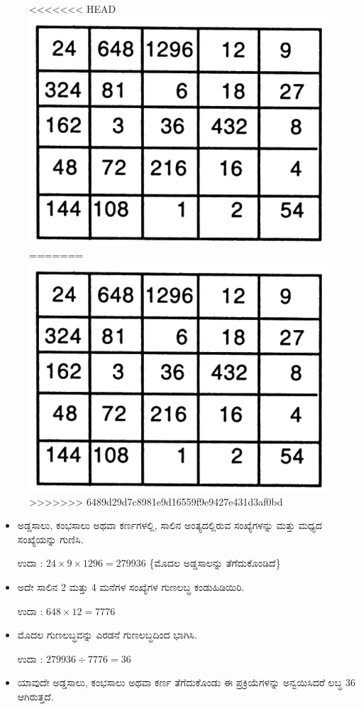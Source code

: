 \begin{figure}[H]
<<<<<<< HEAD
\includegraphics{src/figures/chap7/fig7-31.jpg}
=======
\includegraphics[scale=0.8]{src/figures/chap7/fig7.31.jpg}
>>>>>>> 6489d29d7c8981e9d16559f9e9427e431d3af0bd
\end{figure}
\begin{itemize}
	\item ಅಡ್ಡಸಾಲು, ಕಂಭಸಾಲು ಅಥವಾ ಕರ್ಣಗಳಲ್ಲಿ, ಸಾಲಿನ ಅಂತ್ಯದಲ್ಲಿರುವ ಸಂಖ್ಯೆಗಳನ್ನು ಮತ್ತು ಮಧ್ಯದ ಸಂಖ್ಯೆಯನ್ನು ಗುಣಿಸಿ.

	ಉದಾ : $24 \times 9 \times 1296=279936$ \{ಮೊದಲ ಅಡ್ಡಸಾಲನ್ನು ತೆಗೆದು\-ಕೊಂಡಿದೆ\} 
	\item ಅದೇ ಸಾಲಿನ 2 ಮತ್ತು 4 ಮನೆಗಳ ಸಂಖ್ಯೆಗಳ ಗುಣಲಬ್ಧ ಕಂಡುಹಿಡಿಯಿರಿ.

	ಉದಾ : $648 \times 12=7776$
	\item ಮೊದಲ ಗುಣಲಬ್ಧವನ್ನು ಎರಡನೆ ಗುಣಲಬ್ಧದಿಂದ ಭಾಗಿಸಿ.

	ಉದಾ : $279936 \div 7776 = \boxed{36}$
	\item ಯಾವುದೇ ಅಡ್ಡಸಾಲು, ಕಂಭಸಾಲು ಅಥವಾ ಕರ್ಣ ತೆಗೆದುಕೊಂಡು ಈ ಪ್ರಕ್ರಿಯೆ\-ಗಳನ್ನು ಅನ್ವಯಿಸಿದರೆ ಲಬ್ಧ 36 ಆಗಿರುತ್ತದೆ.
\end{itemize}
